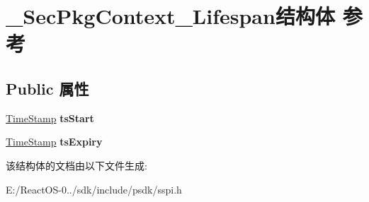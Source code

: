 \hypertarget{struct___sec_pkg_context___lifespan}{}\section{\+\_\+\+Sec\+Pkg\+Context\+\_\+\+Lifespan结构体 参考}
\label{struct___sec_pkg_context___lifespan}
\subsection*{Public 属性}
\begin{DoxyCompactItemize}
\item 
\mbox{\label{struct___sec_pkg_context___lifespan_a010cfe1cf6d84ff2441d23b23bcd71c7}} 
\hyperlink{struct___s_e_c_u_r_i_t_y___i_n_t_e_g_e_r}{Time\+Stamp} {\bfseries ts\+Start}
\item 
\mbox{\label{struct___sec_pkg_context___lifespan_a6154456c874ebb5699c5af20c432e4a5}} 
\hyperlink{struct___s_e_c_u_r_i_t_y___i_n_t_e_g_e_r}{Time\+Stamp} {\bfseries ts\+Expiry}
\end{DoxyCompactItemize}


该结构体的文档由以下文件生成\+:\begin{DoxyCompactItemize}
\item 
E\+:/\+React\+O\+S-\/0../sdk/include/psdk/sspi.\+h\end{DoxyCompactItemize}
